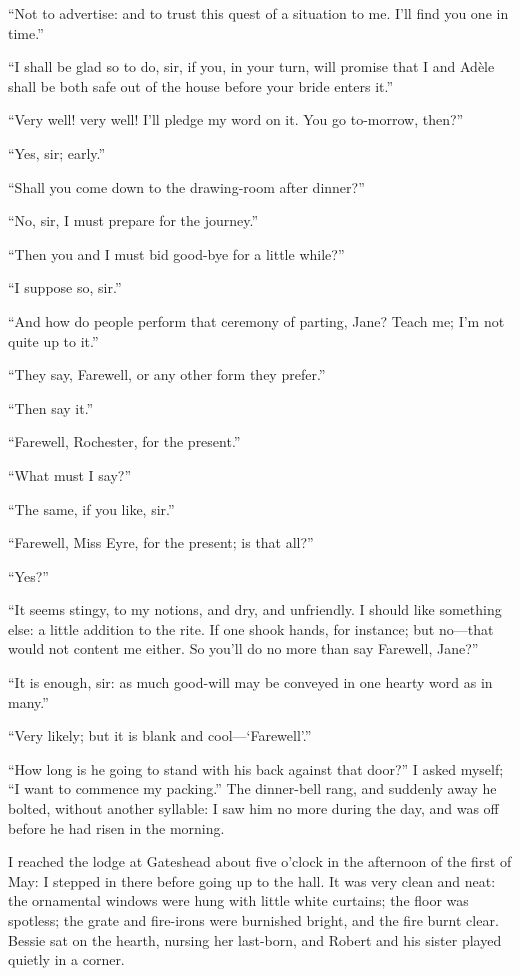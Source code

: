 \enquote{Not to advertise: and to trust this quest of a situation to
me. I'll find you one in time.}

\enquote{I shall be glad so to do, sir, if you, in your turn, will
promise that I and Adèle shall be both safe out of the house before your
bride enters it.}

\enquote{Very well! very well! I'll pledge my word on it. You go
to-morrow, then?}

\enquote{Yes, sir; early.}

\enquote{Shall you come down to the drawing-room after dinner?}

\enquote{No, sir, I must prepare for the journey.}

\enquote{Then you and I must bid good-bye for a little while?}

\enquote{I suppose so, sir.}

\enquote{And how do people perform that ceremony of parting, Jane? 
Teach me; I'm not quite up to it.}

\enquote{They say, Farewell, or any other form they prefer.}

\enquote{Then say it.}

\enquote{Farewell, \Mr{} Rochester, for the present.}

\enquote{What must I say?}

\enquote{The same, if you like, sir.}

\enquote{Farewell, Miss Eyre, for the present; is that all?}

\enquote{Yes?}

\enquote{It seems stingy, to my notions, and dry, and unfriendly. I
should like something else: a little addition to the rite. If one shook
hands, for instance; but no---that would not content me either. So
you'll do no more than say Farewell, Jane?}

\enquote{It is enough, sir: as much good-will may be conveyed in one
hearty word as in many.}

\enquote{Very likely; but it is blank and cool---\enquote{Farewell}.}

\enquote{How long is he going to stand with his back against that door?}
I asked myself; \enquote{I want to commence my packing.} The
dinner-bell rang, and suddenly away he bolted, without another syllable:
I saw him no more during the day, and was off before he had risen in the
morning.

I reached the lodge at Gateshead about five o'clock in the afternoon of
the first of May: I stepped in there before going up to the hall. It
was very clean and neat: the ornamental windows were hung with little
white curtains; the floor was spotless; the grate and fire-irons were
burnished bright, and the fire burnt clear. Bessie sat on the hearth,
nursing her last-born, and Robert and his sister played quietly in a
corner.

